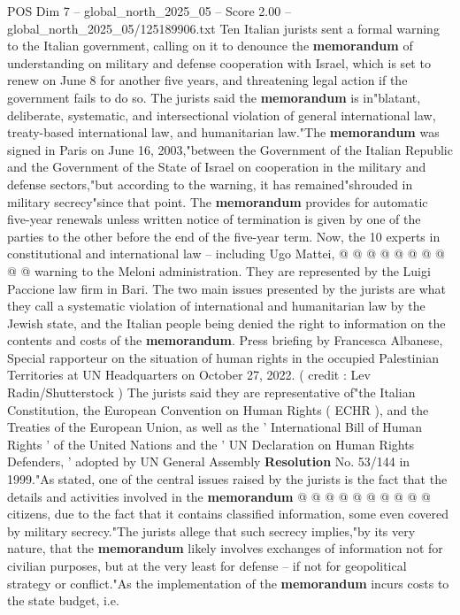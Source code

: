 \begin{textsample}{POS Dim 7 – global\_north\_2025\_05 – Score 2.00 – global\_north\_2025\_05/125189906.txt}  \label{ex:f7_pos_349}
Ten Italian jurists sent a formal warning to the Italian government, calling on it to denounce the \textbf{memorandum} of understanding on military and defense cooperation with Israel, which is set to renew on June 8 for another five years, and threatening legal action if the government fails to do so.
The jurists said the \textbf{memorandum} is in"blatant, deliberate, systematic, and intersectional violation of general international law, treaty-based international law, and humanitarian law."The \textbf{memorandum} was signed in Paris on June 16, 2003,"between the Government of the Italian Republic and the Government of the State of Israel on cooperation in the military and defense sectors,"but according to the warning, it has remained"shrouded in military secrecy"since that point.
The \textbf{memorandum} provides for automatic five-year renewals unless written notice of termination is given by one of the parties to the other before the end of the five-year term.
Now, the 10 experts in constitutional and international law -- including Ugo Mattei, @ @ @ @ @ @ @ @ @ @ warning to the Meloni administration.
They are represented by the Luigi Paccione law firm in Bari.
The two main issues presented by the jurists are what they call a systematic violation of international and humanitarian law by the Jewish state, and the Italian people being denied the right to information on the contents and costs of the \textbf{memorandum}.
Press briefing by Francesca Albanese, Special rapporteur on the situation of human rights in the occupied Palestinian Territories at UN Headquarters on October 27, 2022. ( credit : Lev Radin/Shutterstock ) The jurists said they are representative of"the Italian Constitution, the European Convention on Human Rights ( ECHR ), and the Treaties of the European Union, as well as the ' International Bill of Human Rights ' of the United Nations and the ' UN Declaration on Human Rights Defenders, ' adopted by UN General Assembly \textbf{Resolution} No. 53/144 in 1999."As stated, one of the central issues raised by the jurists is the fact that the details and activities involved in the \textbf{memorandum} @ @ @ @ @ @ @ @ @ @ citizens, due to the fact that it contains classified information, some even covered by military secrecy."The jurists allege that such secrecy implies,"by its very nature, that the \textbf{memorandum} likely involves exchanges of information not for civilian purposes, but at the very least for defense -- if not for geopolitical strategy or conflict."As the implementation of the \textbf{memorandum} incurs costs to the state budget, i.e.

\end{textsample}
